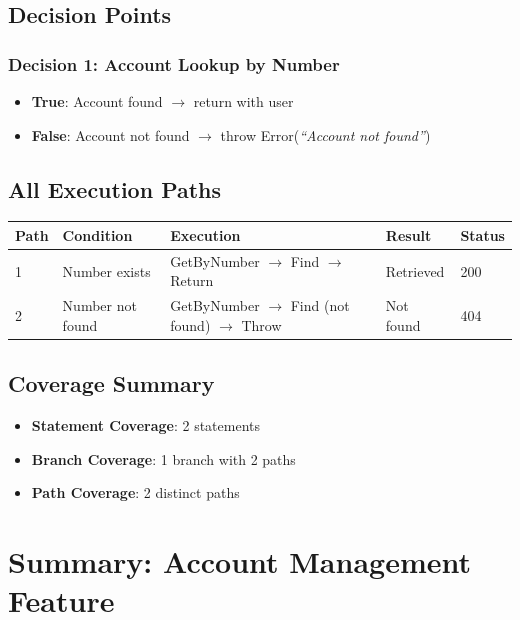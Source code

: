 \subsection{Decision Points}

\subsubsection{Decision 1: Account Lookup by Number}
\begin{itemize}
    \item \textbf{True}: Account found $\rightarrow$ return with user
    \item \textbf{False}: Account not found $\rightarrow$ throw Error(\textit{``Account not found''})
\end{itemize}

\subsection{All Execution Paths}

\begin{longtable}{|L{0.8cm}|L{3cm}|L{5.5cm}|L{2.5cm}|L{1.2cm}|}
\hline
\textbf{Path} & \textbf{Condition} & \textbf{Execution} & \textbf{Result} & \textbf{Status} \\
 & Number exists & GetByNumber $\rightarrow$ Find $\rightarrow$ Return & Retrieved & 200 \\
 & Number not found & GetByNumber $\rightarrow$ Find (not found) $\rightarrow$ Throw & Not found & 404 \\
\hline
\end{longtable}

\subsection{Coverage Summary}
\begin{itemize}
    \item \textbf{Statement Coverage}: 2 statements
    \item \textbf{Branch Coverage}: 1 branch with 2 paths
    \item \textbf{Path Coverage}: 2 distinct paths
\end{itemize}

\section{Summary: Account Management Feature}

